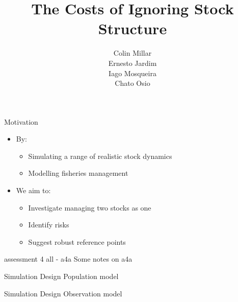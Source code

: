 \documentclass{beamer}
\title{The Costs of Ignoring Stock Structure}
\author{Colin Millar\\Ernesto Jardim\\Iago Mosqueira\\Chato Osio}
\institute{European Commission\\ Joint Research Center}
\begin{document}



\begin{frame}
\titlepage
\end{frame}


\begin{withoutheadline}
\begin{frame}{Motivation}

  \begin{itemize}
    \item By:
    \begin{itemize}
      \item Simulating a range of realistic stock dynamics
      \item Modelling fisheries management
    \end{itemize}
    \item We aim to:
    \begin{itemize}
      \item Investigate managing two stocks as one
      \item Identify risks
      \item Suggest robust reference points
    \end{itemize}
  \end{itemize}
\end{frame}
\end{withoutheadline}


\begin{withoutheadline}
\begin{frame}{assessment 4 all - a4a}
  Some notes on a4a  
\end{frame}
\end{withoutheadline}


\begin{withoutheadline}
\begin{frame}{Simulation Design}
  Population model
\end{frame}
\end{withoutheadline}



\begin{withoutheadline}
\begin{frame}{Simulation Design}
  Observation model
\end{frame}
\end{withoutheadline}
\end{document}
